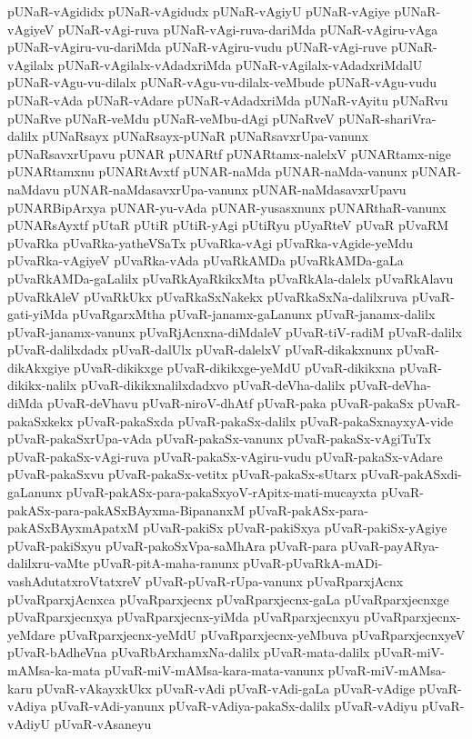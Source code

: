 {pUNaR-vAgididx
pUNaR-vAgidudx
pUNaR-vAgiyU
pUNaR-vAgiye
pUNaR-vAgiyeV
pUNaR-vAgi-ruva
pUNaR-vAgi-ruva-dariMda
pUNaR-vAgiru-vAga
pUNaR-vAgiru-vu-dariMda
pUNaR-vAgiru-vudu
pUNaR-vAgi-ruve
pUNaR-vAgilalx
pUNaR-vAgilalx-vAdadxriMda
pUNaR-vAgilalx-vAdadxriMdalU
pUNaR-vAgu-vu-dilalx
pUNaR-vAgu-vu-dilalx-veMbude
pUNaR-vAgu-vudu
pUNaR-vAda
pUNaR-vAdare
pUNaR-vAdadxriMda
pUNaR-vAyitu
pUNaRvu
pUNaRve
pUNaR-veMdu
pUNaR-veMbu-dAgi
pUNaRveV
pUNaR-shariVra-dalilx
pUNaRsayx
pUNaRsayx-pUNaR
pUNaRsavxrUpa-vanunx
pUNaRsavxrUpavu
pUNAR
pUNARtf
pUNARtamx-nalelxV
pUNARtamx-nige
pUNARtamxnu
pUNARtAvxtf
pUNAR-naMda
pUNAR-naMda-vanunx
pUNAR-naMdavu
pUNAR-naMdasavxrUpa-vanunx
pUNAR-naMdasavxrUpavu
pUNARBipArxya
pUNAR-yu-vAda
pUNAR-yusasxnunx
pUNARthaR-vanunx
pUNARsAyxtf
pUtaR
pUtiR
pUtiR-yAgi
pUtiRyu
pUyaRteV
pUvaR
pUvaRM
pUvaRka
pUvaRka-yatheVSaTx
pUvaRka-vAgi
pUvaRka-vAgide-yeMdu
pUvaRka-vAgiyeV
pUvaRka-vAda
pUvaRkAMDa
pUvaRkAMDa-gaLa
pUvaRkAMDa-gaLalilx
pUvaRkAyaRkikxMta
pUvaRkAla-dalelx
pUvaRkAlavu
pUvaRkAleV
pUvaRkUkx
pUvaRkaSxNakekx
pUvaRkaSxNa-dalilxruva
pUvaR-gati-yiMda
pUvaRgarxMtha
pUvaR-janamx-gaLanunx
pUvaR-janamx-dalilx
pUvaR-janamx-vanunx
pUvaRjAcnxna-diMdaleV
pUvaR-tiV-radiM
pUvaR-dalilx
pUvaR-dalilxdadx
pUvaR-dalUlx
pUvaR-dalelxV
pUvaR-dikakxnunx
pUvaR-dikAkxgiye
pUvaR-dikikxge
pUvaR-dikikxge-yeMdU
pUvaR-dikikxna
pUvaR-dikikx-nalilx
pUvaR-dikikxnalilxdadxvo
pUvaR-deVha-dalilx
pUvaR-deVha-diMda
pUvaR-deVhavu
pUvaR-niroV-dhAtf
pUvaR-paka
pUvaR-pakaSx
pUvaR-pakaSxkekx
pUvaR-pakaSxda
pUvaR-pakaSx-dalilx
pUvaR-pakaSxnayxyA-vide
pUvaR-pakaSxrUpa-vAda
pUvaR-pakaSx-vanunx
pUvaR-pakaSx-vAgiTuTx
pUvaR-pakaSx-vAgi-ruva
pUvaR-pakaSx-vAgiru-vudu
pUvaR-pakaSx-vAdare
pUvaR-pakaSxvu
pUvaR-pakaSx-vetitx
pUvaR-pakaSx-sUtarx
pUvaR-pakASxdi-gaLanunx
pUvaR-pakASx-para-pakaSxyoV-rApitx-mati-mucayxta
pUvaR-pakASx-para-pakASxBAyxma-BipananxM
pUvaR-pakASx-para-pakASxBAyxmApatxM
pUvaR-pakiSx
pUvaR-pakiSxya
pUvaR-pakiSx-yAgiye
pUvaR-pakiSxyu
pUvaR-pakoSxVpa-saMhAra
pUvaR-para
pUvaR-payARya-dalilxru-vaMte
pUvaR-pitA-maha-ranunx
pUvaR-pUvaRkA-mADi-vashAdutatxroVtatxreV
pUvaR-pUvaR-rUpa-vanunx
pUvaRparxjAcnx
pUvaRparxjAcnxca
pUvaRparxjecnx
pUvaRparxjecnx-gaLa
pUvaRparxjecnxge
pUvaRparxjecnxya
pUvaRparxjecnx-yiMda
pUvaRparxjecnxyu
pUvaRparxjecnx-yeMdare
pUvaRparxjecnx-yeMdU
pUvaRparxjecnx-yeMbuva
pUvaRparxjecnxyeV
pUvaR-bAdheVna
pUvaRbArxhamxNa-dalilx
pUvaR-mata-dalilx
pUvaR-miV-mAMsa-ka-mata
pUvaR-miV-mAMsa-kara-mata-vanunx
pUvaR-miV-mAMsa-karu
pUvaR-vAkayxkUkx
pUvaR-vAdi
pUvaR-vAdi-gaLa
pUvaR-vAdige
pUvaR-vAdiya
pUvaR-vAdi-yanunx
pUvaR-vAdiya-pakaSx-dalilx
pUvaR-vAdiyu
pUvaR-vAdiyU
pUvaR-vAsaneyu
}
